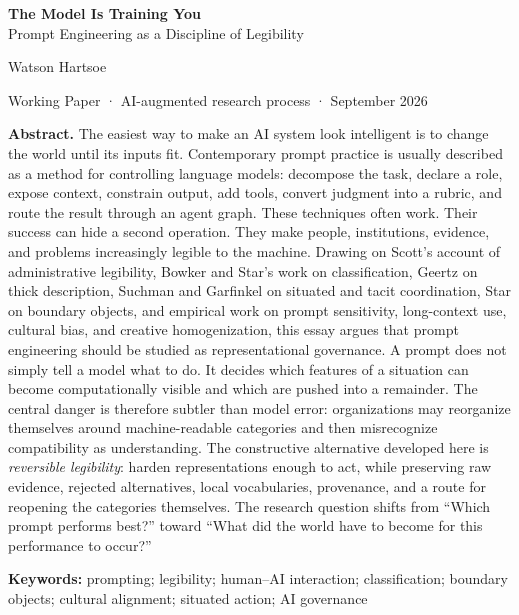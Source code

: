 \documentclass[11pt]{article}
\newcommand{\term}[1]{\textit{#1}}
\begin{document}
\begin{center}
{\LARGE\bfseries The Model Is Training You\\[0.35em]}
{\large Prompt Engineering as a Discipline of Legibility}\par
\vspace{1.0em}
{\normalsize Watson Hartsoe}\par
\vspace{0.25em}
{\small Working Paper · AI-augmented research process · September 2026}
\end{center}

\vspace{0.9em}
\noindent\textbf{Abstract.}
The easiest way to make an AI system look intelligent is to change the world until its inputs fit. Contemporary prompt practice is usually described as a method for controlling language models: decompose the task, declare a role, expose context, constrain output, add tools, convert judgment into a rubric, and route the result through an agent graph. These techniques often work. Their success can hide a second operation. They make people, institutions, evidence, and problems increasingly legible to the machine. Drawing on Scott's account of administrative legibility, Bowker and Star's work on classification, Geertz on thick description, Suchman and Garfinkel on situated and tacit coordination, Star on boundary objects, and empirical work on prompt sensitivity, long-context use, cultural bias, and creative homogenization, this essay argues that prompt engineering should be studied as representational governance. A prompt does not simply tell a model what to do. It decides which features of a situation can become computationally visible and which are pushed into a remainder. The central danger is therefore subtler than model error: organizations may reorganize themselves around machine-readable categories and then misrecognize compatibility as understanding. The constructive alternative developed here is \term{reversible legibility}: harden representations enough to act, while preserving raw evidence, rejected alternatives, local vocabularies, provenance, and a route for reopening the categories themselves. The research question shifts from ``Which prompt performs best?'' toward ``What did the world have to become for this performance to occur?''

\vspace{0.5em}
\noindent\textbf{Keywords:} prompting; legibility; human--AI interaction; classification; boundary objects; cultural alignment; situated action; AI governance
\end{document}
